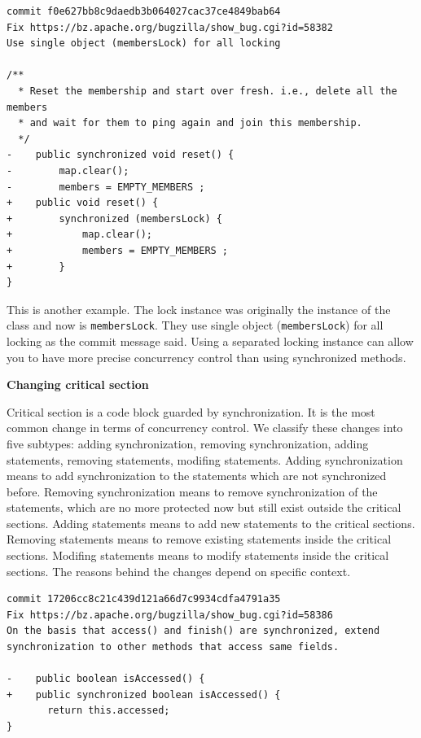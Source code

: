 \documentclass[conference]{IEEEtran}
\begin{document}
\begin{lstlisting}
commit f0e627bb8c9daedb3b064027cac37ce4849bab64
Fix https://bz.apache.org/bugzilla/show_bug.cgi?id=58382
Use single object (membersLock) for all locking

/**
  * Reset the membership and start over fresh. i.e., delete all the members
  * and wait for them to ping again and join this membership.
  */
-    public synchronized void reset() {
-        map.clear();
-        members = EMPTY_MEMBERS ;
+    public void reset() {
+        synchronized (membersLock) {
+            map.clear();
+            members = EMPTY_MEMBERS ;
+        }
}
\end{lstlisting}

This is another example. The lock instance was originally the instance of the class and now is \texttt{membersLock}. They use single object (\texttt{membersLock}) for all locking as the commit message said. Using a separated locking instance can allow you to have more precise concurrency control than using synchronized methods.

\textbf{Changing critical section}

Critical section is a code block guarded by synchronization. It is the most common change in terms of concurrency control. We classify these changes into five subtypes: adding synchronization, removing synchronization, adding statements, removing statements, modifing statements. Adding synchronization means to add synchronization to the statements which are not synchronized before. Removing synchronization means to remove synchronization of the statements, which are no more protected now but still exist outside the critical sections. Adding statements means to add new statements to the critical sections. Removing statements means to remove existing statements inside the critical sections. Modifing statements means to modify statements inside the critical sections. The reasons behind the changes depend on specific context.

\begin{lstlisting}
commit 17206cc8c21c439d121a66d7c9934cdfa4791a35
Fix https://bz.apache.org/bugzilla/show_bug.cgi?id=58386
On the basis that access() and finish() are synchronized, extend synchronization to other methods that access same fields.

-    public boolean isAccessed() {
+    public synchronized boolean isAccessed() {
       return this.accessed;
}
\end{lstlisting}
\end{document}
